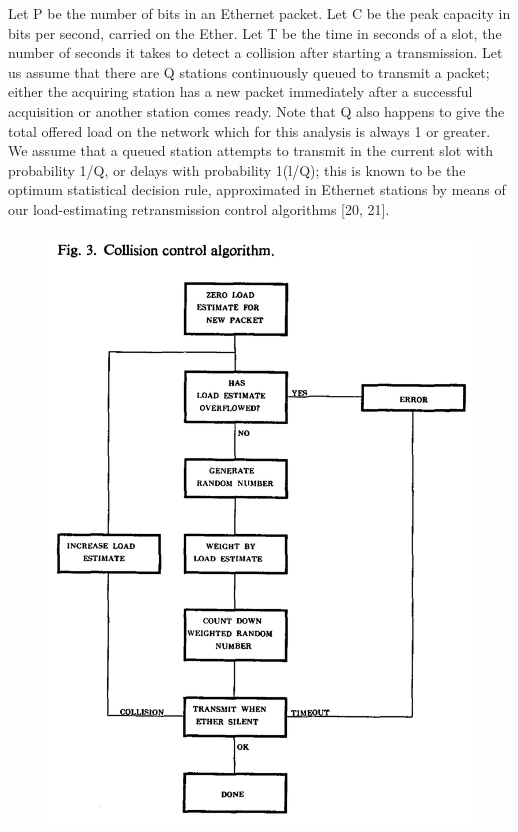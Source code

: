 Let P be the number of bits in an Ethernet packet. Let C be the peak capacity in bits per second, carried on the Ether. Let T be the time in seconds of a slot, the number of seconds it takes to detect a collision after starting a transmission. Let us assume that there are Q stations continuously queued to transmit a packet; either the acquiring station has a new packet immediately after a successful acquisition or another station comes ready. Note that Q also happens to give the total offered load on the network which for this analysis is always 1 or greater. We assume that a queued station attempts to transmit in the current slot with probability 1/Q, or delays with probability 1(l/Q); this is known to be the optimum statistical decision rule, approximated in Ethernet stations by means of our load-estimating retransmission control algorithms [20, 21].

\begin{figure}[h!]
\centering
  \includegraphics[trim =0mm 0mm 0mm 0mm, clip, width=\columnwidth]{Figures/Ethernet-Fig-3.png} %
\end{figure}

